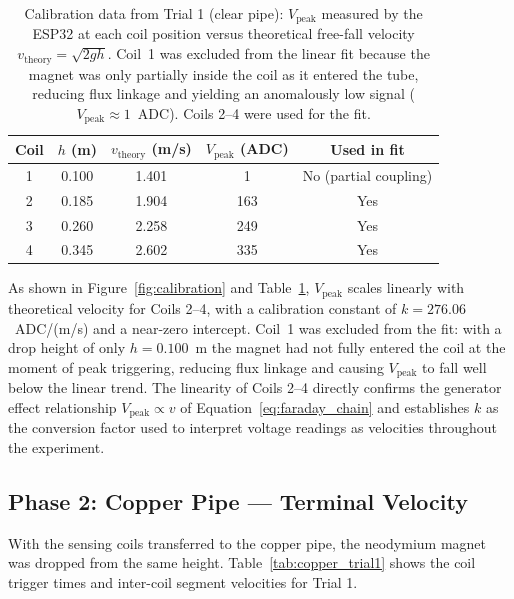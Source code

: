 \documentclass[11pt]{article}
\begin{document}
\begin{table}[H]
\centering
\caption{Calibration data from Trial 1 (clear pipe): $V_\text{peak}$ measured by the
ESP32 at each coil position versus theoretical free-fall velocity
$v_\text{theory} = \sqrt{2gh}$. Coil~1 was excluded from the linear fit because
the magnet was only partially inside the coil as it entered the tube, reducing
flux linkage and yielding an anomalously low signal ($V_\text{peak} \approx 1$~ADC).
Coils 2--4 were used for the fit.}
\label{tab:calibration}
\begin{tabular}{ccccc}
\toprule
Coil & $h$ (m) & $v_\text{theory}$ (m/s) & $V_\text{peak}$ (ADC) & Used in fit \\
\midrule
1 & 0.100 & 1.401 &   1 & No (partial coupling) \\
2 & 0.185 & 1.904 & 163 & Yes \\
3 & 0.260 & 2.258 & 249 & Yes \\
4 & 0.345 & 2.602 & 335 & Yes \\
\bottomrule
\end{tabular}
\end{table}

As shown in Figure~\ref{fig:calibration} and Table~\ref{tab:calibration}, $V_\text{peak}$
scales linearly with theoretical velocity for Coils 2--4, with a calibration constant of
$k = 276.06$~ADC/(m/s) and a near-zero intercept. Coil~1 was excluded from the fit: with
a drop height of only $h = 0.100$~m the magnet had not fully entered the coil at the
moment of peak triggering, reducing flux linkage and causing $V_\text{peak}$ to fall well
below the linear trend. The linearity of Coils 2--4 directly confirms the generator effect
relationship $V_\text{peak} \propto v$ of Equation~\ref{eq:faraday_chain} and establishes
$k$ as the conversion factor used to interpret voltage readings as velocities throughout
the experiment.

\subsection{Phase 2: Copper Pipe — Terminal Velocity}

With the sensing coils transferred to the copper pipe, the neodymium magnet was dropped from
the same height. Table~\ref{tab:copper_trial1} shows the coil trigger times and inter-coil
segment velocities for Trial 1.
\end{document}
